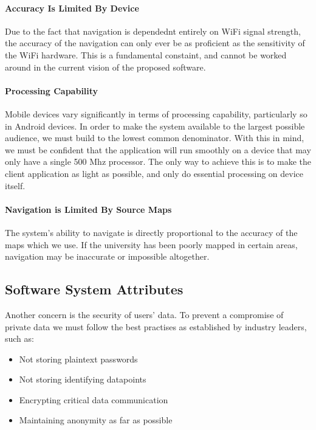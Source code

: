 \documentclass[10pt,a4paper]{article}
\begin{document}
			\paragraph{Accuracy Is Limited By Device}

				Due to the fact that navigation is dependednt entirely on WiFi signal
				strength, the accuracy of the navigation can only ever be as proficient
				as the sensitivity of the WiFi hardware. This is a fundamental constaint,
				and cannot be worked around in the current vision of the proposed
				software.

			\paragraph{Processing Capability}

				Mobile devices vary significantly in terms of processing capability,
				particularly so in Android devices. In order to make the system
				available to the largest possible audience, we must build to the lowest
				common denominator. With this in mind, we must be confident that the
				application will run smoothly on a device that may only have a single
				500 Mhz processor. The only way to achieve this is to make the client
				application as light as possible, and only do essential processing on
				device itself.

				\paragraph{Navigation is Limited By Source Maps}

				The system's ability to navigate is directly proportional to the accuracy
				of the maps which we use. If the university has been poorly mapped in
				certain areas, navigation may be inaccurate or impossible altogether.

		\subsection{Software System Attributes}

			Another concern is the security of users' data. To prevent a compromise of
			private data we must follow the best practises as established by industry
			leaders, such as:

			\begin{itemize}
				\item Not storing plaintext passwords
				\item Not storing identifying datapoints
				\item Encrypting critical data communication
				\item Maintaining anonymity as far as possible
			\end{itemize}
\end{document}
